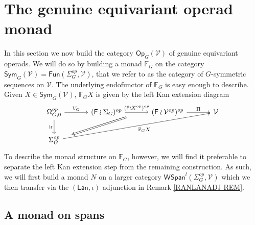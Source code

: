 \documentclass[a4paper,10pt]{article}%
\begin{document}
\section{The genuine equivariant operad monad}\label{GENUINE_OP_MONAD_SECTION}


In this section we now build the category 
$\mathsf{Op}_G (\mathcal{V})$
of genuine equivariant operads.
We will do so by building a monad $\mathbb{F}_G$
on the category
$\mathsf{Sym}_G(\mathcal{V}) = 
\mathsf{Fun}(\Sigma_G^{op},\mathcal{V})$,
that we refer to as the category of $G$-symmetric sequences on $\mathcal{V}$. The underlying endofunctor of $\mathbb{F}_G$ is easy enough to describe. Given $X \in \mathsf{Sym}_G(\mathcal{V})$, $\mathbb{F}_G X$ is given by the left Kan extension diagram
\begin{equation}
\begin{tikzcd}[row sep=2em,column sep = 3.3em]
	\Omega_{G,0}^{op} \ar{r}{V_{G}} \ar{d}[swap]{\mathsf{lr}} &
(\Fin \wr \Sigma_G)^{op} \ar{r}[swap,name=F1]{}{(\Fin \wr X^{op})^{op}}& (\Fin \wr \mathcal{V}^{op})^{op} \ar{r}{\Pi} & \mathcal{V}
\\
	|[alias=G2]|
	\Sigma_G^{op}  \ar{urrr}[swap]{\mathbb{F}_G X} & &
\arrow[Rightarrow, from=F1, to=G2,shorten >=0.45cm,shorten <=0.45cm]
\end{tikzcd}
\end{equation}
To describe the monad structure on $\mathbb{F}_G$, however, we will find it preferable to separate the left Kan extension 
step from the remaining construction.
As such, we will first build a monad 
$N$ on a larger category
$\mathsf{WSpan}^l(\Sigma_G^{op},\mathcal{V})$
which we then transfer via the $(\mathsf{Lan},\iota)$ adjunction in Remark \ref{RANLANADJ REM}.





\subsection{A monad on spans}
\end{document}

